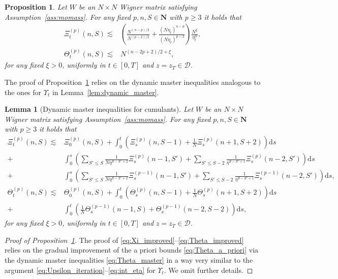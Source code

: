 \documentclass[10pt]{amsart}
\newtheorem{lemma}[theorem]{Lemma}
\newtheorem{proposition}[theorem]{Proposition}
\numberwithin{equation}{section}
\newcommand{\nc}{\normalcolor}
\newcommand{\dif}{\mathrm{d}}
\newcommand{\N}{\mathbf{N}}
\begin{document}
\begin{proposition}\label{prop:Theta_improved} Let $W$ be an $N\times N$ Wigner matrix satisfying Assumption~\ref{ass:momass}. For any fixed $p, n,S\in \N$ with $p\ge 3$ it holds that
\begin{align}
\Xi_t^{(p)}(n,S)\lesssim & \left(\frac{N^{(n-p)/2}}{N^{(p-2)/2}} + \frac{(N\eta_t)^{n-p}}{(N\eta_t)^{p-2}}\right)\frac{N^\xi}{\eta_t^S},\label{eq:Xi_improved}\\
\Theta_t^{(p)}(n,S)\lesssim & N^{(n-2p+2)/2+\xi},
\label{eq:Theta_improved}
\end{align}
for any fixed $\xi>0$, uniformly in $t\in [0,T]$ and $z=z_T\in\mathcal{D}$.
\end{proposition}

The proof of Proposition~\ref{prop:Theta_improved} relies on the dynamic master inequalities analogous to the ones for $\Upsilon_t$ in Lemma~\ref{lem:dynamic_master}.\nc


\begin{lemma}[Dynamic master inequalities for cumulants]\label{lem:master_Xi} Let $W$ be an $N\times N$ Wigner matrix satisfying Assumption~\ref{ass:momass}. For any fixed $p, n,S\in \N$ with $p\ge 3$ it holds that
\begin{equation}
\begin{split}
\Xi_t^{(p)}(n,S) \lesssim &\Xi_0^{(p)}(n,S) + \int_0^t \left(\Xi^{(p)}_s(n,S-1) +\frac{1}{N}\Xi^{(p)}_s(n+1,S+2)\right) \dif s\\
+&\int_0^s\left(\sum_{S'\le S} \frac{1}{N\eta^{S-S'+2}}\Xi^{(p)}_s(n-1,S') + \sum_{S'\le S-2} \frac{1}{\eta^{S-S'+1}}\Xi^{(p)}_s(n-2,S')\right)\dif s\\
+&\int_0^s\left(\sum_{S'\le S} \frac{1}{N\eta^{S-S'+2}}\Xi^{(p-1)}_s(n-1,S') + \sum_{S'\le S-2} \frac{1}{\eta^{S-S'+1}}\Xi^{(p-1)}_s(n-2,S')\right)\dif s,\\
\Theta_t^{(p)}(n,S) \lesssim &\Theta_0^{(p)}(n,S) + \int_0^t \left(\Theta^{(p)}_s(n,S-1) +\frac{1}{N}\Theta^{(p)}_s(n+1,S+2)\right) \dif s\\
+&\int_0^t \left(\frac{1}{N}\Theta_s^{(p-1)}(n-1,S) +\Theta_s^{(p-1)}(n-2,S-2)\right)\dif s,
\end{split}
\label{eq:Theta_master}
\end{equation}
for any fixed $\xi>0$, uniformly in $t\in [0,T]$ and $z=z_T\in\mathcal{D}$.
\end{lemma}


\begin{proof}[Proof of Proposition~\ref{prop:Theta_improved}] The proof of \eqref{eq:Xi_improved}--\eqref{eq:Theta_improved} relies on the gradual improvement of the a priori bounds \eqref{eq:Theta_a_priori} via the dynamic master inequalities \eqref{eq:Theta_master} in a way very similar to the argument \eqref{eq:Upsilon_iteration}--\eqref{eq:int_eta} for $\Upsilon_t$. We omit further details.
\end{proof}
\end{document}
